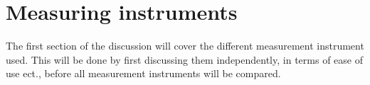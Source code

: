 \section{Measuring instruments}

The first section of the discussion will cover the different measurement instrument used. This will be done by first discussing them independently, in terms of ease of use ect., before all measurement instruments will be compared.




